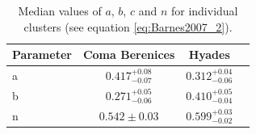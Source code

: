 \documentclass[useAMS, usenatbib]{mn2e}
\begin{document}
\begin{table}
	\caption{Median values of $a$, $b$, $c$ and $n$ for individual clusters
		(see equation \ref{eq:Barnes2007_2}).  %
\label{tab:cluster_results}}

\begin{center}
\begin{tabular}{lccc}
\hline\hline
{Parameter} & {Coma Berenices} & {Hyades} \\
\hline
a & $0.417^{+0.08}_{-0.07}$ & $0.312^{+0.04}_{-0.06}$ \\
b & $0.271^{+0.05}_{-0.06}$ & $0.410^{+0.05}_{-0.04}$ \\
n & $0.542 \pm 0.03$ & $0.599^{+0.03}_{-0.02}$ \\
\hline
\end{tabular}
\end{center}
\end{table}
\end{document}
